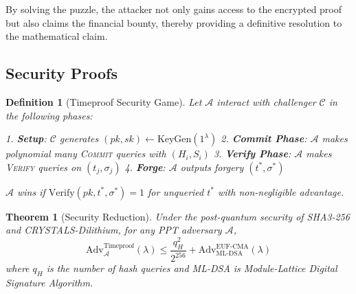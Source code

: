 \documentclass[12pt]{report}
\newtheorem{theorem}{Theorem}
\newtheorem{definition}{Definition}
\begin{document}
By solving the puzzle, the attacker not only gains access to the encrypted proof but also claims the financial bounty, thereby providing a definitive resolution to the mathematical claim.

\subsection{Security Proofs}
\begin{definition}[Timeproof Security Game]
Let $\mathcal{A}$ interact with challenger $\mathcal{C}$ in the following phases:

1. \textbf{Setup}: $\mathcal{C}$ generates $(pk, sk) \leftarrow \text{KeyGen}(1^\lambda)$
2. \textbf{Commit Phase}: $\mathcal{A}$ makes polynomial many \textsc{Commit} queries with $(H_i, S_i)$
3. \textbf{Verify Phase}: $\mathcal{A}$ makes \textsc{Verify} queries on $(t_j, \sigma_j)$
4. \textbf{Forge}: $\mathcal{A}$ outputs forgery $(t^*, \sigma^*)$

$\mathcal{A}$ wins if $\text{Verify}(pk, t^*, \sigma^*) = 1$ for unqueried $t^*$ with non-negligible advantage.
\end{definition}

\begin{theorem}[Security Reduction]
Under the post-quantum security of SHA3-256 and CRYSTALS-Dilithium, for any PPT adversary $\mathcal{A}$,
\[
\text{Adv}_{\mathcal{A}}^{\text{Timeproof}}(\lambda) \leq \frac{q_H^2}{2^{256}} + \text{Adv}_{\text{ML-DSA}}^{\text{EUF-CMA}}(\lambda)
\]
where $q_H$ is the number of hash queries and ML-DSA is Module-Lattice Digital Signature Algorithm.
\end{theorem}
\end{document}
